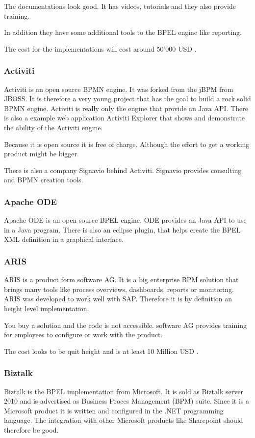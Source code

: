 \documentclass[paper=a4,twoside=false,BCOR=0mm,DIV=calc,fontsize=12pt]{scrartcl}
\begin{document}
The documentations look good. It has videos, tutorials and they also provide training. 

In addition they have some additional tools to the BPEL engine like reporting.

The cost for the implementations will cost around 50'000 USD \cite{activvosscost}.


\subsubsection{Activiti}
Activiti \cite{activiti} is an open source BPMN engine. It was forked from the jBPM \cite{jbpm} from JBOSS. It is therefore a very young project that has the goal to build a rock solid BPMN engine. Activiti is really only the engine that provide an Java API. There is also a example web application Activiti Explorer that shows and demonstrate the ability of the Activiti engine.

Because it is open source it is free of charge. Although the effort to get a working product might be bigger. 

There is also a company Signavio \cite{signavio} behind Activiti. Signavio provides consulting and BPMN creation tools.

\subsubsection{Apache ODE}
Apache ODE \cite{appacheODE} is an open source BPEL engine. ODE provides an Java API to use in a Java program.
There is also an eclipse plugin, that helps create the BPEL XML definition in a graphical interface.


\subsubsection{ARIS}
ARIS \cite{aris} is a product form software AG. It is a big enterprise BPM solution that brings many tools like process overviews, dashboards, reports or monitoring. ARIS was developed to work well with SAP. Therefore it is by definition an height level implementation.

You buy a solution and the code is not accessible. software AG provides training for employees to configure or work with the product. 

The cost looks to be quit height and is at least 10 Million USD \cite{ariscost}.


\subsubsection{Biztalk}
Biztalk \cite{biztalk} is the BPEL implementation from Microsoft. It is sold as Biztalk server 2010 and is advertised as Business Proces Management (BPM) suite. Since it is a Microsoft product it is written and configured in the .NET programming language. The integration with other Microsoft products like Sharepoint should therefore be good.
\end{document}
